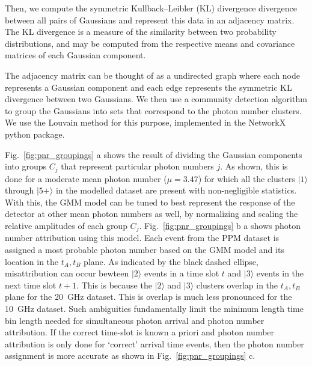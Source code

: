 \documentclass[11pt]{caltech_thesis} %
\begin{document}
Then, we compute the symmetric Kullback--Leibler (KL) divergence divergence between all pairs of Gaussians and represent this data in an adjacency matrix. The KL divergence is a measure of the similarity between two probability distributions, and may be computed from the respective means and covariance matrices of each Gaussian component.

The adjacency matrix can be thought of as a undirected graph where each node represents a Gaussian component and each edge represents the symmetric KL divergence between two Gaussians. We then use a community detection algorithm to group the Gaussians into sets that correspond to the photon number clusters. We use the Louvain method \autocite{Blondel2008} for this purpose, implemented in the NetworkX python package.

Fig.~\ref{fig:pnr_groupings} a shows the result of dividing the Gaussian components into groups $C_j$ that represent particular photon numbers $j$. As shown, this is done for a moderate mean photon number ($\mu=3.47$) for which all the clusters $|1\rangle$ through $|5+\rangle$ in the modelled dataset are present with non-negligible statistics. With this, the GMM model can be tuned to best represent the response of the detector at other mean photon numbers as well, by normalizing and scaling the relative amplitudes of each group $C_j$. Fig.~\ref{fig:pnr_groupings} b a shows photon number attribution using this model. Each event from the PPM dataset is assigned a most probable photon number based on the GMM model and its location in the $t_A, t_B$ plane. As indicated by the black dashed ellipse, misattribution can occur bewteen $|2\rangle$ events in a time slot $t$ and $|3\rangle$ events in the next time slot $t+1$. This is because the $|2\rangle$ and $|3\rangle$ clusters overlap in the $t_A, t_B$ plane for the 20~GHz dataset. This is overlap is much less pronounced for the 10~GHz dataset. Such ambiguities fundamentally limit the minimum length time bin length needed for simultaneous photon arrival and photon number attribution. If the correct time-slot is known a priori and photon number attribution is only done for `correct' arrival time events, then the photon number assignment is more accurate as shown in Fig.~\ref{fig:pnr_groupings} c.~
\end{document}
